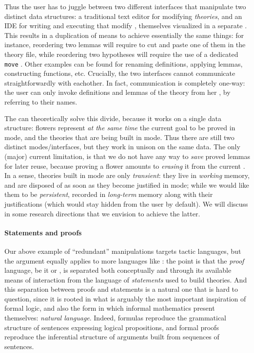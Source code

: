 Thus the user has to juggle between two different interfaces that manipulate two
distinct data structures: a traditional text editor for modifying
\emph{theories}, and an IDE for writing and executing  that
modify \emph{}, themselves visualized in a separate .
This results in a duplication of means to achieve essentially the same things:
for instance, reordering two lemmas will require to cut and paste one of them in
the theory file, while reordering two hypotheses will require the use of a
dedicated \texttt{move} . Other examples can be found for renaming
definitions, applying lemmas, constructing functions, etc. Crucially, the two
interfaces cannot communicate straightforwardly with eachother. In fact,
communication is completely one-way: the user can only invoke definitions and
lemmas of the theory from her , by referring to their names.

The  can theoretically solve this divide, because it works on a
single data structure: flowers represent \emph{at the same time} the current
goal to be proved in \Proof mode, and the theories that are being built in \Edit
mode. Thus there are still two distinct modes/interfaces, but they work in
unison on the same data. The only (major) current limitation, is that we do not
have any way to \emph{save} proved lemmas for later reuse, because proving a
flower amounts to \emph{erasing} it from the current . In a sense, theories
built in \Edit mode are only \emph{transient}: they live in \emph{working}
memory, and are disposed of as soon as they become justified in \Proof mode;
while we would like them to be \emph{persistent}, recorded in \emph{long-term}
memory along with their justifications (which would stay hidden from the user by
default). We will discuss in  some research directions that
we envision to achieve the latter. 

\paragraph{Statements and proofs}

Our above example of ``redundant'' manipulations targets  tactic
languages, but the argument equally applies to more  languages
like : the point is that the \emph{proof} language, be it  or
, is separated both conceptually and through its available means
of interaction from the language of \emph{statements} used to build theories.
And this separation between proofs and statements is a natural one that is hard
to question, since it is rooted in what is arguably the most important
inspiration of formal logic, and also the form in which informal mathematics
present themselves: \emph{natural language}. Indeed,  formulas
reproduce the grammatical structure of sentences expressing logical
propositions, and formal proofs reproduce the inferential structure of arguments
built from sequences of sentences.

